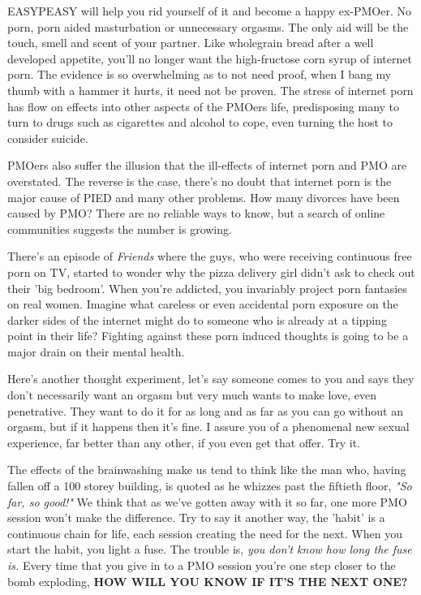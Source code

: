 \documentclass[easypeasy.tex]{subfiles}
\begin{document}
EASYPEASY will help you rid yourself of it and become a happy ex-PMOer. No porn, porn aided masturbation or unnecessary orgasms. The only aid will be the touch, smell and scent of your partner. Like wholegrain bread after a well developed appetite, you'll no longer want the high-fructose corn syrup of internet porn. The evidence is so overwhelming as to not need proof, when I bang my thumb with a hammer it hurts, it need not be proven. The stress of internet porn has flow on effects into other aspects of the PMOers life, predisposing many to turn to drugs such as cigarettes and alcohol to cope, even turning the host to consider suicide.

PMOers also suffer the illusion that the ill-effects of internet porn and PMO are overstated. The reverse is the case, there's no doubt that internet porn is the major cause of PIED and many other problems. How many divorces have been caused by PMO? There are no reliable ways to know, but a search of online communities suggests the number is growing.

There's an episode of \textit{Friends} where the guys, who were receiving continuous free porn on TV, started to wonder why the pizza delivery girl didn't ask to check out their 'big bedroom'. When you're addicted, you invariably project porn fantasies on real women. Imagine what careless or even accidental porn exposure on the darker sides of the internet might do to someone who is already at a tipping point in their life? Fighting against these porn induced thoughts is going to be a major drain on their mental health.

Here's another thought experiment, let's say someone comes to you and says they don't necessarily want an orgasm but very much wants to make love, even penetrative. They want to do it for as long and as far as you can go without an orgasm, but if it happens then it's fine. I assure you of a phenomenal new sexual experience, far better than any other, if you even get that offer. Try it.

The effects of the brainwashing make us tend to think like the man who, having fallen off a 100 storey building, is quoted as he whizzes past the fiftieth floor, \textit{"So far, so good!"} We think that as we've gotten away with it so far, one more PMO session won't make the difference. Try to say it another way, the 'habit' is a continuous chain for life, each session creating the need for the next. When you start the habit, you light a fuse. The trouble is, \textit{you don't know how long the fuse is.} Every time that you give in to a PMO session you're one step closer to the bomb exploding, \textbf{HOW WILL YOU KNOW IF IT'S THE NEXT ONE?}
\end{document}
